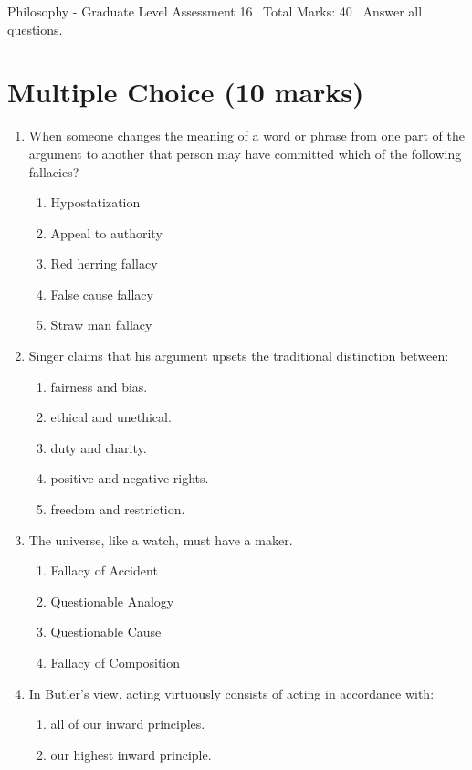 \documentclass[12pt]{article}
\begin{document}
\begin{center}
Philosophy - Graduate Level Assessment 16 \
Total Marks: 40 \
Answer all questions.
\end{center}

\section*{Multiple Choice (10 marks)}
\begin{enumerate}[label=\arabic*.]
\item When someone changes the meaning of a word or phrase from one part of the argument to another that person may have committed which of the following fallacies?
\begin{enumerate}[label=(\alph*)]
    \item Hypostatization
    \item Appeal to authority
    \item Red herring fallacy
    \item False cause fallacy
    \item Straw man fallacy
\end{enumerate}
\item Singer claims that his argument upsets the traditional distinction between:
\begin{enumerate}[label=(\alph*)]
    \item fairness and bias.
    \item ethical and unethical.
    \item duty and charity.
    \item positive and negative rights.
    \item freedom and restriction.
\end{enumerate}
\item The universe, like a watch, must have a maker.
\begin{enumerate}[label=(\alph*)]
    \item Fallacy of Accident
    \item Questionable Analogy
    \item Questionable Cause
    \item Fallacy of Composition
\end{enumerate}
\item In Butler's view, acting virtuously consists of acting in accordance with:
\begin{enumerate}[label=(\alph*)]
    \item all of our inward principles.
    \item our highest inward principle.

\end{enumerate}
\end{enumerate}
\end{document}
